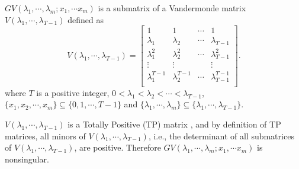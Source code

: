 \documentclass[twocolumn]{autart}    %
\begin{document}
\begin{pf}
$GV(\lambda_1, \cdots, \lambda_m; x_1, \cdots x_m)$ is a submatrix of a Vandermonde matrix $V(\lambda_1, \cdots, \lambda_{T-1})$ defined as
\begin{equation}
V(\lambda_1, \cdots, \lambda_{T-1}) = 
	\begin{bmatrix}1 & 1 & \cdots & 1 \\
			\lambda_1 & \lambda_2 & \cdots & \lambda_{T-1} \\
			\lambda_1^{2} & \lambda_2^{2} & \cdots & \lambda_{T-1}^{2} \\
			\vdots & \vdots  & & \vdots\\
			\lambda_1^{T-1} & \lambda_2^{T-1} & \cdots & \lambda_{T-1}^{T-1} \\
	\end{bmatrix}.
	\end{equation}\nonumber
where $T$ is a positive integer, $0< \lambda_1 < \lambda_2 < \cdots < \lambda_{T-1}$, $\{x_1, x_2, \cdots, x_m\} \subseteq \{0, 1, \cdots, T-1\}$ and $\{ \lambda_1,\cdots, \lambda_m\} \subseteq \{ \lambda_1,\cdots, \lambda_{T-1}\} $.

$V(\lambda_1, \cdots, \lambda_{T-1})$ is a Totally Positive (TP) matrix \cite{fallat2011tnm}, and by definition of TP matrices, all minors of $V(\lambda_1, \cdots, \lambda_{T-1})$, i.e., the determinant of all submatrices of $V(\lambda_1, \cdots, \lambda_{T-1})$, are positive. Therefore $GV(\lambda_1, \cdots, \lambda_m; x_1, \cdots x_m) $ is nonsingular.
\end{pf}
\vspace{-0.4cm}
\end{document}
